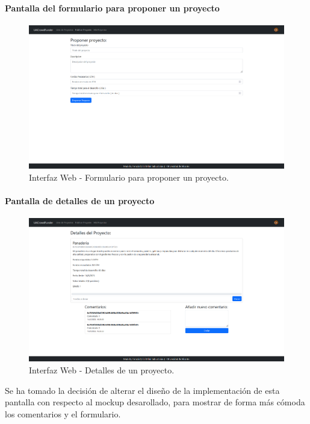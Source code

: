 \paragraph{Pantalla del formulario para proponer un proyecto}
\begin{figure}[H]
        \centering
        \includegraphics[width=1\textwidth]{img/interfaz/publicar_proyecto.png}
        \caption{Interfaz Web - Formulario para proponer un proyecto.}
        \label{fig:configApi}
\end{figure}

\paragraph{Pantalla de detalles de un proyecto}
\begin{figure}[H]
        \centering
        \includegraphics[width=1\textwidth]{img/interfaz/detalles_proyecto.png}
        \caption{Interfaz Web - Detalles de un proyecto.}
        \label{fig:configApi}
\end{figure}

Se ha tomado la decisión de alterar el diseño de la implementación de esta pantalla con respecto al mockup desarollado, para mostrar de forma más cómoda los comentarios y el formulario. 

